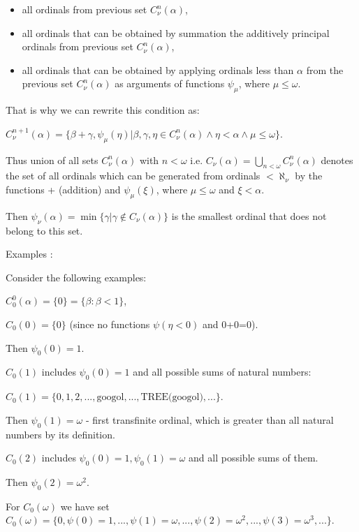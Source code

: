 \documentclass[10pt]{article}
\begin{document}
\begin{itemize}
     \setlength{\itemsep}{1pt}
     \setlength{\parskip}{0pt}
     \setlength{\parsep}{0pt}
\item all ordinals from previous set \(C_\nu^n(\alpha)\),
\item all ordinals that can be obtained by summation the additively principal ordinals from previous set \(C_\nu^n(\alpha)\),
\item all ordinals that can be obtained by applying ordinals less than \(\alpha\) from the previous set \(C_\nu^n(\alpha)\) as arguments of functions \(\psi_\mu\), where \(\mu\le\omega\).
\end{itemize}

That is why we can rewrite this condition as:

\(C_\nu^{n+1}(\alpha) = \{\beta+\gamma,\psi_\mu(\eta)|\beta, \gamma,\eta\in C_{\nu}^n(\alpha)\wedge\eta<\alpha \wedge \mu \leq \omega\}\).

Thus union of all sets \(C_\nu^n (\alpha)\) with \(n<\omega\) i.e. \(C_\nu(\alpha) = \bigcup_{n < \omega} C_\nu^n (\alpha)\) denotes the set of all ordinals which can be generated from ordinals \(<\aleph_\nu\) by the functions + (addition) and \(\psi_{\mu}(\xi)\), where \(\mu\le\omega\) and \(\xi<\alpha\).

Then \( \psi_\nu(\alpha) = \min\{\gamma | \gamma \not\in C_\nu(\alpha)\}\) is the smallest ordinal that does not belong to this set.

Examples :

Consider the following examples:

\(C_0^0(\alpha)=\{0\} =\{\beta:\beta<1\}\),

\(C_0(0)=\{0\}\) (since no functions \(\psi(\eta<0)\) and 0+0=0).

Then \(\psi_0(0)=1\).

\(C_0(1)\) includes \(\psi_0(0)=1\) and all possible sums of natural numbers:

\(C_0(1)=\{0,1,2,...,\text{googol}, ...,\text{TREE(googol)},...\}\).

Then \(\psi_0(1)=\omega\) - first transfinite ordinal, which is greater than all natural numbers by its definition.

\(C_0(2)\) includes \(\psi_0(0)=1, \psi_0(1)=\omega\) and all possible sums of them.

Then \(\psi_0(2)=\omega^2\).

For \(C_0(\omega)\) we have set \(C_0(\omega)=\{0,\psi(0)=1,...,\psi(1)=\omega,...,\psi(2)=\omega^2,...,\psi(3)=\omega^3,...\}\).
\end{document}
